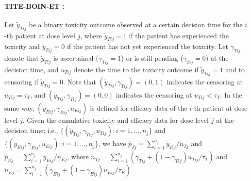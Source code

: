 \paragraph{TITE-BOIN-ET \citep{takeda:2020,lin:2020c}:} Let $\tilde{y}_{Tij}$ be a binary toxicity outcome observed at a certain decision time for the $i$-th patient at dose level $j$, where $\tilde{y}_{Tij}=1$ if the patient has experienced the toxicity and $\tilde{y}_{Tij}=0$ if the patient has not yet experienced the toxicity. Let $\gamma_{Tij}$ denote that $\tilde{y}_{Tij}$ is ascertained ($\gamma_{Tij}=1$) or is still pending ($\gamma_{Tij}=0$) at the decision time, and $u_{Tij}$ denote the time to the toxicity outcome if $\tilde{y}_{Tij}=1$ and to censoring if $\tilde{y}_{Tij}=0$. Note that $(\tilde{y}_{Tij},\gamma_{Tij})=(0,1)$ indicates the censoring at $u_{Tij}=\tau_T$, and $(\tilde{y}_{Tij},\gamma_{Tij})=(0,0)$ indicates the censoring at $u_{Tij}<\tau_T$. In the same way, $(\tilde{y}_{Eij},\gamma_{Eij},u_{Eij})$ is defined for efficacy data of the $i$-th patient at dose level $j$. Given the cumulative toxicity and efficacy data for dose level $j$ at the decision time; i.e., $\{(\tilde{y}_{Tij},\gamma_{Tij},u_{Tij}):i=1,\ldots,n_j\}$ and $\{(\tilde{y}_{Eij},\gamma_{Eij},u_{Eij}):i=1,\ldots,n_j\}$, we have $\hat{p}_{Tj}=\sum_{i=1}^{n_j}\tilde{y}_{Tij}/\tilde{n}_{Tj}$ and $\hat{p}_{Ej}=\sum_{i=1}^{n_j}\tilde{y}_{Eij}/\tilde{n}_{Ej}$, where $\tilde{n}_{Tj}=\sum_{i=1}^{n_j}(\gamma_{Tij}+(1-\gamma_{Tij})u_{Tij}/\tau_T)$ and $\tilde{n}_{Ej}=\sum_{i=1}^{n_j}(\gamma_{Eij}+(1-\gamma_{Eij})u_{Eij}/\tau_E)$.


